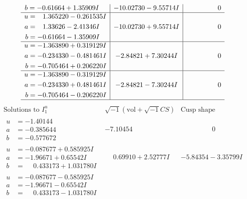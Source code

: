 \documentclass[1p]{elsarticle_modified}
\theoremstyle{definition}
\newcommand{\I}{\sqrt{-1}}
\begin{document}
$$\begin{array}{c|c|c}
\begin{aligned}
b &= -0.61664 + 1.35909 I\end{aligned}
 & -10.02730 - 9.55714 I & \phantom{-0.000000 } 0 \\ \hline\begin{aligned}
u &= \phantom{-}1.365220 - 0.261535 I \\
a &= \phantom{-}1.33626 - 2.41346 I \\
b &= -0.61664 - 1.35909 I\end{aligned}
 & -10.02730 + 9.55714 I & \phantom{-0.000000 } 0 \\ \hline\begin{aligned}
u &= -1.363890 + 0.319129 I \\
a &= -0.234330 - 0.481461 I \\
b &= -0.705464 + 0.206220 I\end{aligned}
 & -2.84821 + 7.30244 I & \phantom{-0.000000 } 0 \\ \hline\begin{aligned}
u &= -1.363890 - 0.319129 I \\
a &= -0.234330 + 0.481461 I \\
b &= -0.705464 - 0.206220 I\end{aligned}
 & -2.84821 - 7.30244 I & \phantom{-0.000000 } 0\\
 \hline 
 \end{array}$$\newpage$$\begin{array}{c|c|c}  
\text{Solutions to }I^u_{1}& \I (\text{vol} + \sqrt{-1}CS) & \text{Cusp shape}\\
 \hline 
\begin{aligned}
u &= -1.40144\phantom{ +0.000000I} \\
a &= -0.385644\phantom{ +0.000000I} \\
b &= -0.577672\phantom{ +0.000000I}\end{aligned}
 & -7.10454\phantom{ +0.000000I} & \phantom{-0.000000 } 0 \\ \hline\begin{aligned}
u &= -0.087677 + 0.585925 I \\
a &= -1.96671 + 0.65542 I \\
b &= \phantom{-}0.433173 + 1.031780 I\end{aligned}
 & \phantom{-}0.69910 + 2.52777 I & -5.84354 - 3.35799 I \\ \hline\begin{aligned}
u &= -0.087677 - 0.585925 I \\
a &= -1.96671 - 0.65542 I \\
b &= \phantom{-}0.433173 - 1.031780 I\end{aligned}

\end{array}$$
\end{document}
